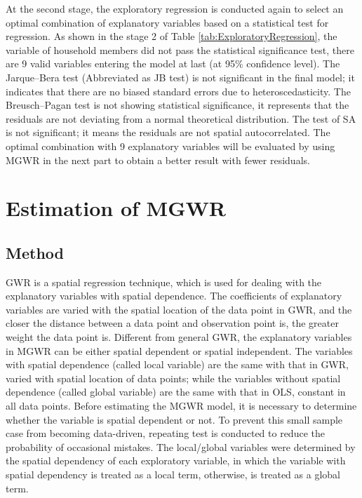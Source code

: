 \documentclass[utf8]{article}
\begin{document}
At the second stage, the exploratory regression is conducted again to select an optimal combination of explanatory variables based on a statistical test for regression. As shown in the stage 2 of Table \ref{tab:ExploratoryRegression}, the variable of household members did not pass the statistical significance test, there are 9 valid variables entering the model at last (at 95\% confidence level). The Jarque–Bera test (Abbreviated as JB test) is not significant in the final model; it indicates that there are no biased standard errors due to heteroscedasticity. The Breusch–Pagan test is not showing statistical significance, it represents that the residuals are not deviating from a normal theoretical distribution. The test of SA is not significant; it means the residuals are not spatial autocorrelated. The optimal combination with 9 explanatory variables will be evaluated by using MGWR in the next part to obtain a better result with fewer residuals.

\section{Estimation of MGWR}
\subsection{Method}
\indent

GWR is a spatial regression technique, which is used for dealing with the explanatory variables with spatial dependence. The coefficients of explanatory variables are varied with the spatial location of the data point in GWR, and the closer the distance between a data point and observation point is, the greater weight the data point is. Different from general GWR, the explanatory variables in MGWR can be either spatial dependent or spatial independent. The variables with spatial dependence (called local variable) are the same with that in GWR, varied with spatial location of data points; while the variables without spatial dependence (called global variable) are the same with that in OLS, constant in all data points. Before estimating the MGWR model, it is necessary to determine whether the variable is spatial dependent or not. To prevent this small sample case from becoming data-driven, repeating test is conducted to reduce the probability of occasional mistakes. The local/global variables were determined by the spatial dependency of each exploratory variable, in which the variable with spatial dependency is treated as a local term, otherwise, is treated as a global term.
\end{document}

